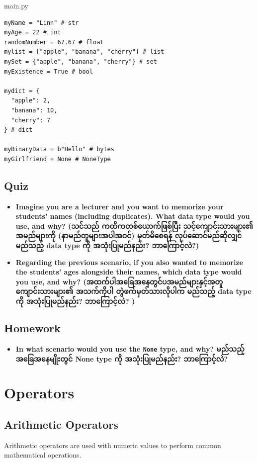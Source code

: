 \documentclass{report}
\begin{document}
\begin{vscode}{main.py}
\begin{lstlisting}[style=vscodeStyle]
myName = "Linn" # str
myAge = 22 # int
randomNumber = 67.67 # float
mylist = ["apple", "banana", "cherry"] # list
mySet = {"apple", "banana", "cherry"} # set
myExistence = True # bool

mydict = {
  "apple": 2,
  "banana": 10,
  "cherry": 7
} # dict

myBinaryData = b"Hello" # bytes
myGirlfriend = None # NoneType
\end{lstlisting}
\end{vscode}

\subsection*{Quiz}
\begin{itemize}
    \item \textbf{Imagine you are a lecturer and you want to memorize your students' names (including duplicates). What data type would you use, and why? ({\burmesefont သင်သည် ကထိကတစ်ယောက်ဖြစ်ပြီး သင့်ကျောင်းသားများ၏ အမည်များကို (နာမည်တူများအပါအဝင်) မှတ်မိစေရန် လုပ်ဆောင်မည်ဆိုလျှင် မည်သည့် data type ကို အသုံးပြုမည်နည်း? ဘာကြောင့်လဲ?}) }
    \item \textbf{Regarding the previous scenario, if you also wanted to memorize the students' ages alongside their names, which data type would you use, and why? ({\burmesefont အထက်ပါအခြေအနေတွင်ပအမည်များနှင့်အတူ ကျောင်းသားများ၏ အသက်ကိုပါ တွဲဖက်မှတ်သားလိုပါက မည်သည့် data type ကို အသုံးပြုမည်နည်း? ဘာကြောင့်လဲ?
})}
\end{itemize}

\subsection*{Homework}
\begin{itemize}
    \item \textbf{In what scenario would you use the \texttt{None} type, and why? {\burmesefont မည်သည့်အခြေအနေမျိုးတွင် None type ကို အသုံးပြုမည်နည်း? ဘာကြောင့်လဲ?
}} 
\end{itemize}

\section{Operators}
\subsection{Arithmetic Operators}
Arithmetic operators are used with numeric values to perform common mathematical operations.
\\\\
\end{document}
